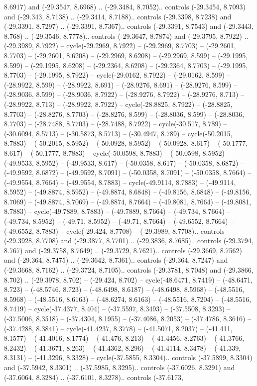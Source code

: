 \begin{scope}[shift={(2.5552, 9.9912)}]
\begin{scope}[shift={(48.1654, -14.8546)}]
8.6917) and (-29.3547, 8.6968) .. (-29.3484, 8.7052).. controls (-29.3454, 8.7093) and (-29.343, 8.7138) .. (-29.3414, 8.7188).. controls (-29.3398, 8.7238) and (-29.3391, 8.7297) .. (-29.3391, 8.7367).. controls (-29.3391, 8.7543) and (-29.3443, 8.768) .. (-29.3546, 8.7778).. controls (-29.3647, 8.7874) and (-29.3795, 8.7922) .. (-29.3989, 8.7922) -- cycle(-29.2969, 8.7922) -- (-29.2969, 8.7703) -- (-29.2601, 8.7703) -- (-29.2601, 8.6208) -- (-29.2969, 8.6208) -- (-29.2969, 8.599) -- (-29.1995, 8.599) -- (-29.1995, 8.6208) -- (-29.2364, 8.6208) -- (-29.2364, 8.7703) -- (-29.1995, 8.7703) -- (-29.1995, 8.7922) -- cycle(-29.0162, 8.7922) -- (-29.0162, 8.599) -- (-28.9922, 8.599) -- (-28.9922, 8.691) -- (-28.9276, 8.691) -- (-28.9276, 8.599) -- (-28.9036, 8.599) -- (-28.9036, 8.7922) -- (-28.9276, 8.7922) -- (-28.9276, 8.713) -- (-28.9922, 8.713) -- (-28.9922, 8.7922) -- cycle(-28.8825, 8.7922) -- (-28.8825, 8.7703) -- (-28.8276, 8.7703) -- (-28.8276, 8.599) -- (-28.8036, 8.599) -- (-28.8036, 8.7703) -- (-28.7488, 8.7703) -- (-28.7488, 8.7922) -- cycle(-30.517, 8.789) -- (-30.6094, 8.5713) -- (-30.5873, 8.5713) -- (-30.4947, 8.789) -- cycle(-50.2015, 8.7883) -- (-50.2015, 8.5952) -- (-50.0928, 8.5952) -- (-50.0928, 8.617) -- (-50.1777, 8.617) -- (-50.1777, 8.7883) -- cycle(-50.0598, 8.7883) -- (-50.0598, 8.5952) -- (-49.9533, 8.5952) -- (-49.9533, 8.617) -- (-50.0358, 8.617) -- (-50.0358, 8.6872) -- (-49.9592, 8.6872) -- (-49.9592, 8.7091) -- (-50.0358, 8.7091) -- (-50.0358, 8.7664) -- (-49.9554, 8.7664) -- (-49.9554, 8.7883) -- cycle(-49.9114, 8.7883) -- (-49.9114, 8.5952) -- (-49.8874, 8.5952) -- (-49.8874, 8.6848) -- (-49.8156, 8.6848) -- (-49.8156, 8.7069) -- (-49.8874, 8.7069) -- (-49.8874, 8.7664) -- (-49.8081, 8.7664) -- (-49.8081, 8.7883) -- cycle(-49.7889, 8.7883) -- (-49.7889, 8.7664) -- (-49.734, 8.7664) -- (-49.734, 8.5952) -- (-49.71, 8.5952) -- (-49.71, 8.7664) -- (-49.6552, 8.7664) -- (-49.6552, 8.7883) -- cycle(-29.424, 8.7708) -- (-29.3989, 8.7708).. controls (-29.3928, 8.7708) and (-29.3877, 8.7701) .. (-29.3836, 8.7685).. controls (-29.3794, 8.767) and (-29.3758, 8.7649) .. (-29.3729, 8.7621).. controls (-29.3669, 8.7562) and (-29.364, 8.7475) .. (-29.3642, 8.7361).. controls (-29.364, 8.7247) and (-29.3668, 8.7162) .. (-29.3724, 8.7105).. controls (-29.3781, 8.7048) and (-29.3866, 8.702) .. (-29.3978, 8.702) -- (-29.424, 8.702) -- cycle(-48.6471, 8.7419) -- (-48.6471, 8.723) -- (-48.5746, 8.723) -- (-48.6498, 8.6187) -- (-48.6498, 8.5968) -- (-48.5516, 8.5968) -- (-48.5516, 8.6163) -- (-48.6274, 8.6163) -- (-48.5516, 8.7204) -- (-48.5516, 8.7419) -- cycle(-37.4377, 8.404) -- (-37.5597, 8.3493) -- (-37.5508, 8.3293) -- (-37.5006, 8.3518) -- (-37.4304, 8.1955) -- (-37.4086, 8.2053) -- (-37.4786, 8.3616) -- (-37.4288, 8.3841) -- cycle(-41.4237, 8.3778) -- (-41.5071, 8.2037) -- (-41.411, 8.1577) -- (-41.4016, 8.1774) -- (-41.476, 8.213) -- (-41.4456, 8.2763) -- (-41.3766, 8.2432) -- (-41.3671, 8.263) -- (-41.4362, 8.296) -- (-41.4114, 8.3478) -- (-41.339, 8.3131) -- (-41.3296, 8.3328) -- cycle(-37.5855, 8.3304).. controls (-37.5899, 8.3304) and (-37.5942, 8.3301) .. (-37.5985, 8.3295).. controls (-37.6026, 8.3291) and (-37.6064, 8.3284) .. (-37.6101, 8.3278).. controls (-37.6173, 
\end{scope}
\end{scope}
